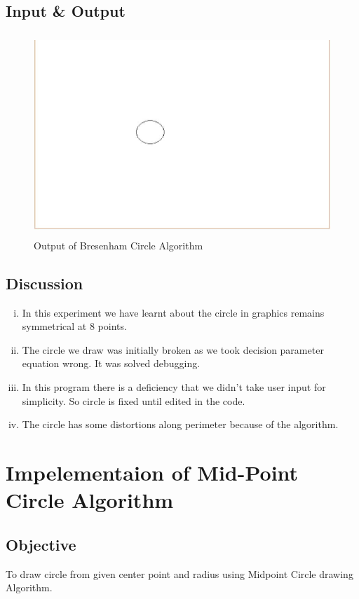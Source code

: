 \documentclass[11pt]{report}
\begin{document}
\section{Input \& Output}
\begin{figure}[h]
	\centering
	\includegraphics[height=3.0in,width=4.5in]{bres_circle_out}
	\caption{Output of Bresenham Circle Algorithm}
	
\end{figure}
\section{Discussion}
\begin{enumerate}[(i)]
	\item In this experiment we have learnt about the circle in graphics remains symmetrical at 8 points.
	\item The circle we draw was initially broken as we took decision parameter equation wrong. It was solved debugging.
	\item In this program there is a deficiency that we didn't take user input for simplicity. So circle is fixed until edited in the code.
	\item The circle has some  distortions along perimeter because of the algorithm.
\end{enumerate}


\chapter{Impelementaion of Mid-Point Circle Algorithm}
\section{Objective}
To draw circle from given center point and radius using Midpoint Circle drawing Algorithm.
\end{document}
